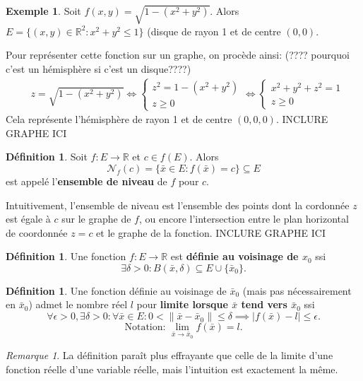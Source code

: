 \documentclass{report}
\theoremstyle{plain}
\theoremstyle{definition}
\newtheorem{defn}[thm]{Définition}
\newtheorem{exmp}[thm]{Exemple}
\theoremstyle{remark}
\newtheorem*{remark}{Remarque}
\newcommand*{\norm}[1]{\lVert#1\rVert}
\newcommand*{\abs}[1]{\lvert#1\rvert}
\begin{document}
\begin{exmp}
	Soit $f(x,y) = \sqrt{1 - (x^2 + y^2)}$. Alors $E = \{(x, y) \in \mathbb R^2 : x^2 + y^2 \leq 1\}$ (disque de rayon 1 et de centre $(0, 0)$. \par
	Pour représenter cette fonction sur un graphe, on procède ainsi: (???? pourquoi c'est un hémisphère si c'est un disque????)
	\begin{align*}
		&z = \sqrt{1 - (x^2 + y^2)} \iff 
		\begin{cases}
			z^2 = 1 - (x^2 + y^2) \\
			z \geq 0		
		\end{cases} \iff
		\begin{cases}
			x^2 + y^2 + z^2 = 1 \\
			z \geq 0
		\end{cases}
	\end{align*}
	Cela représente l'hémisphère de rayon 1 et de centre $(0, 0, 0)$. INCLURE GRAPHE ICI
\end{exmp}

\begin{defn}
	Soit $f : E \to \mathbb R$ et $c \in f(E)$. Alors 
	\begin{equation}
	\mathcal N_f(c) = \{\bar x \in E : f(\bar x) = c\} \subseteq E
	\end{equation}
	est appelé l'\textbf{ensemble de niveau} de $f$ pour $c$.
\end{defn}
Intuitivement, l'ensemble de niveau est l'ensemble des points dont la cordonnée $z$ est égale à $c$ sur le graphe de $f$, ou encore l'intersection entre le plan horizontal de coordonnée $z = c$ et le graphe de la fonction. INCLURE GRAPHE ICI

\begin{defn}
	Une fonction $f : E \to \mathbb R$ est \textbf{définie au voisinage de $x_0$} ssi
	\begin{equation}
		\exists \delta > 0 : B(\bar x, \delta) \subseteq E \cup \{\bar x_0\}.
	\end{equation}
\end{defn}

\begin{defn}
	Une fonction définie au voisinage de $\bar x_0$ (mais pas nécessairement en $\bar x_0$) admet le nombre réel $l$ pour \textbf{limite lorsque $\bar x$ tend vers $\bar x_0$} ssi 
	\begin{equation}
	\forall \epsilon > 0, \exists \delta > 0 : \forall \bar x \in E : 0 < \norm{\bar x - \bar x_0} \leq \delta \implies \abs{f(\bar x) - l} \leq \epsilon.
	\end{equation}
	\begin{equation*}
		\text{Notation: } \lim_{\bar x \to \bar x_0} f(\bar x) = l. 
	\end{equation*}
\end{defn} 
\begin{remark}
	La définition paraît plus effrayante que celle de la limite d'une fonction réelle d'une variable réelle, mais l'intuition est exactement la même.
\end{remark}
\end{document}
